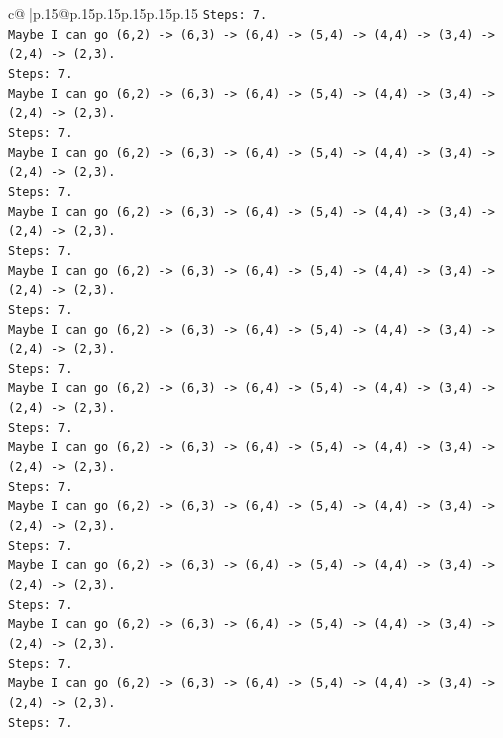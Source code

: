 \documentclass{article}
\begin{document}
{\begin{supertabular}{c@{$\;$}|p{.15\linewidth}@{}p{.15\linewidth}p{.15\linewidth}p{.15\linewidth}p{.15\linewidth}p{.15\linewidth}}
{{{\texttt{Steps: 7.} \\
\texttt{Maybe I can go (6,2) {-}> (6,3) {-}> (6,4) {-}> (5,4) {-}> (4,4) {-}> (3,4) {-}> (2,4) {-}> (2,3).} \\
\texttt{Steps: 7.} \\
\texttt{Maybe I can go (6,2) {-}> (6,3) {-}> (6,4) {-}> (5,4) {-}> (4,4) {-}> (3,4) {-}> (2,4) {-}> (2,3).} \\
\texttt{Steps: 7.} \\
\texttt{Maybe I can go (6,2) {-}> (6,3) {-}> (6,4) {-}> (5,4) {-}> (4,4) {-}> (3,4) {-}> (2,4) {-}> (2,3).} \\
\texttt{Steps: 7.} \\
\texttt{Maybe I can go (6,2) {-}> (6,3) {-}> (6,4) {-}> (5,4) {-}> (4,4) {-}> (3,4) {-}> (2,4) {-}> (2,3).} \\
\texttt{Steps: 7.} \\
\texttt{Maybe I can go (6,2) {-}> (6,3) {-}> (6,4) {-}> (5,4) {-}> (4,4) {-}> (3,4) {-}> (2,4) {-}> (2,3).} \\
\texttt{Steps: 7.} \\
\texttt{Maybe I can go (6,2) {-}> (6,3) {-}> (6,4) {-}> (5,4) {-}> (4,4) {-}> (3,4) {-}> (2,4) {-}> (2,3).} \\
\texttt{Steps: 7.} \\
\texttt{Maybe I can go (6,2) {-}> (6,3) {-}> (6,4) {-}> (5,4) {-}> (4,4) {-}> (3,4) {-}> (2,4) {-}> (2,3).} \\
\texttt{Steps: 7.} \\
\texttt{Maybe I can go (6,2) {-}> (6,3) {-}> (6,4) {-}> (5,4) {-}> (4,4) {-}> (3,4) {-}> (2,4) {-}> (2,3).} \\
\texttt{Steps: 7.} \\
\texttt{Maybe I can go (6,2) {-}> (6,3) {-}> (6,4) {-}> (5,4) {-}> (4,4) {-}> (3,4) {-}> (2,4) {-}> (2,3).} \\
\texttt{Steps: 7.} \\
\texttt{Maybe I can go (6,2) {-}> (6,3) {-}> (6,4) {-}> (5,4) {-}> (4,4) {-}> (3,4) {-}> (2,4) {-}> (2,3).} \\
\texttt{Steps: 7.} \\
\texttt{Maybe I can go (6,2) {-}> (6,3) {-}> (6,4) {-}> (5,4) {-}> (4,4) {-}> (3,4) {-}> (2,4) {-}> (2,3).} \\
\texttt{Steps: 7.} \\
\texttt{Maybe I can go (6,2) {-}> (6,3) {-}> (6,4) {-}> (5,4) {-}> (4,4) {-}> (3,4) {-}> (2,4) {-}> (2,3).} \\
\texttt{Steps: 7.} \\
}}}
\end{supertabular}}
\end{document}
